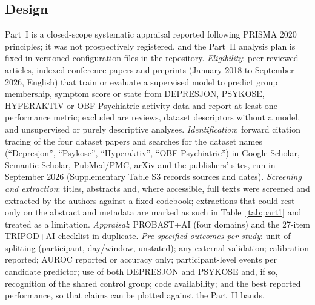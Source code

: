 \documentclass[11pt,a4paper]{article}
\begin{document}
\subsection{Design}
Part~I is a closed-scope systematic appraisal reported following PRISMA 2020 principles; it was
not prospectively registered, and the Part~II analysis plan is fixed in versioned configuration
files in the repository. \emph{Eligibility}: peer-reviewed articles, indexed conference papers and preprints
(January 2018 to September 2026, English) that train or evaluate a supervised model to predict group
membership, symptom score or state from DEPRESJON, PSYKOSE, HYPERAKTIV or OBF-Psychiatric activity
data and report at least one performance metric; excluded are reviews, dataset descriptors without
a model, and unsupervised or purely descriptive analyses. \emph{Identification}: forward citation tracing of
the four dataset papers and searches for the dataset names (``Depresjon'', ``Psykose'',
``Hyperaktiv'', ``OBF-Psychiatric'') in Google Scholar, Semantic Scholar, PubMed/PMC, arXiv and the
publishers' sites, run in September 2026 (Supplementary Table S3 records sources and dates).
\emph{Screening and extraction}: titles, abstracts and, where accessible, full texts were
screened and extracted by the authors against a fixed codebook; extractions that could rest only
on the abstract and metadata are marked as such in Table~\ref{tab:part1} and treated as a
limitation.
\emph{Appraisal}: PROBAST+AI (four domains) and the 27-item TRIPOD+AI checklist in duplicate.
\emph{Pre-specified outcomes per study}: unit of splitting (participant, day/window, unstated);
any external validation; calibration reported; AUROC reported or accuracy only; participant-level
events per candidate predictor; use of both DEPRESJON and PSYKOSE and, if so, recognition of the
shared control group; code availability; and the best reported performance, so that claims can be
plotted against the Part~II bands.
\end{document}
